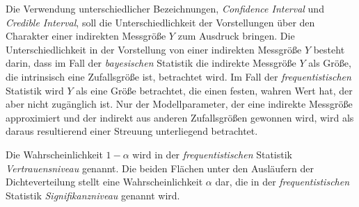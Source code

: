 Die Verwendung unterschiedlicher Bezeichnungen, \textsl{Confidence Interval} und
\textsl{Credible Interval}, soll die Unterschiedlichkeit der Vorstellungen
über den Charakter einer indirekten Messgröße $Y$ zum Ausdruck bringen.
Die Unterschiedlichkeit in der Vorstellung von einer indirekten Messgröße $Y$ besteht darin,
dass im Fall der \textsl{bayesischen} Statistik
die indirekte Messgröße $Y$ als Größe, die intrinsisch eine Zufallsgröße ist, betrachtet
wird. Im Fall der \textsl{frequentistischen} Statistik wird $Y$ als eine Größe betrachtet,
die einen festen, wahren Wert hat, der aber nicht zugänglich ist. Nur der
Modellparameter, der eine indirekte Messgröße approximiert und der indirekt aus anderen
Zufallsgrößen gewonnen wird, wird als daraus resultierend einer Streuung unterliegend betrachtet.

Die Wahrscheinlichkeit $1 - \alpha$ wird in der \textsl{frequentistischen} Statistik
\textsl{Vertrauensniveau} genannt. Die beiden Flächen unter den
Ausläufern der Dichteverteilung stellt eine Wahrscheinlichkeit $\alpha$ dar, die in der
\textsl{frequentistischen} Statistik \textsl{Signifikanzniveau} genannt wird.

